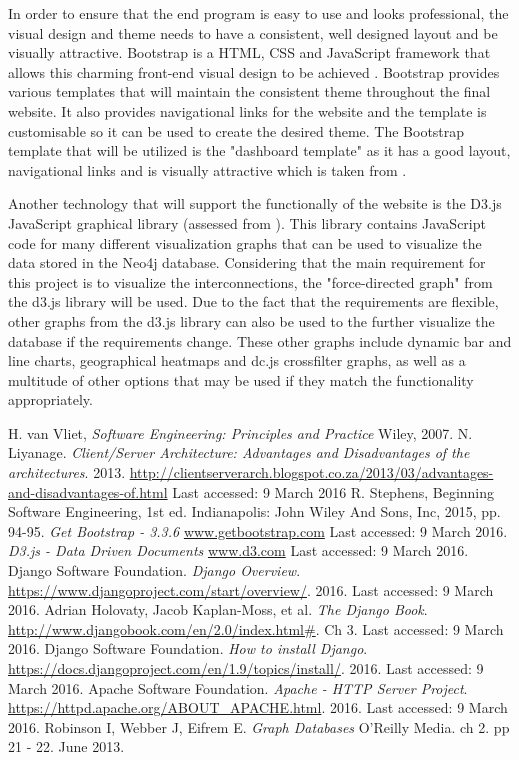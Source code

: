 \documentclass[10pt,onecolumn]{article}
\begin{document}
In order to ensure that the end program is easy to use and looks professional, the visual design and theme needs to have a consistent, well designed layout and be visually attractive. Bootstrap is a HTML, CSS and JavaScript framework that allows this charming front-end visual design to be achieved \cite{Bootstrap}. Bootstrap provides various templates that will maintain the consistent theme throughout the final website. It also provides navigational links for the website and the template is customisable so it can be used to create the desired theme. The Bootstrap template that will be utilized is the "dashboard template" as it has a good layout, navigational links and is visually attractive which is taken from \cite{Bootstrap}.

Another technology that will support the functionally of the website is the D3.js JavaScript graphical library (assessed from \cite{D3}). This library contains JavaScript code for many different visualization graphs that can be used to visualize the data stored in the Neo4j database. Considering that the main requirement for this project is to visualize the interconnections, the "force-directed graph" from the d3.js library will be used. Due to the fact that the requirements are flexible, other graphs from the d3.js library can also be used to the further visualize the database if the requirements change. These other graphs include dynamic bar and line charts, geographical heatmaps and dc.js crossfilter graphs, as well as a multitude of other options that may be used if they match the functionality appropriately.

\begin{thebibliography}{1}
 H. van Vliet, \emph{Software Engineering: Principles and Practice} Wiley, 2007.
 N. Liyanage. \emph{Client/Server Architecture: Advantages and Disadvantages of the architectures}. 2013. \url{http://clientserverarch.blogspot.co.za/2013/03/advantages-and-disadvantages-of.html} Last accessed: 9 March 2016
 R. Stephens, Beginning Software Engineering, 1st ed. Indianapolis: John Wiley And Sons, Inc, 2015, pp. 94-95.
  \emph{Get Bootstrap - 3.3.6} \url{www.getbootstrap.com} Last accessed: 9 March 2016.
  \emph{D3.js - Data Driven Documents} \url{www.d3.com} Last accessed: 9 March 2016.
 Django Software Foundation. \emph{Django Overview}. \url{https://www.djangoproject.com/start/overview/}. 2016. Last accessed: 9 March 2016. 
 Adrian Holovaty, Jacob Kaplan-Moss, et al. \emph{The Django Book}. \url{http://www.djangobook.com/en/2.0/index.html#}. Ch 3. Last accessed: 9 March 2016.
 Django Software Foundation. \emph{How to install Django}. \url{https://docs.djangoproject.com/en/1.9/topics/install/}. 2016. Last accessed: 9 March 2016.	
 Apache Software Foundation. \emph{Apache - HTTP Server Project}. \url{https://httpd.apache.org/ABOUT_APACHE.html}. 2016. Last accessed: 9 March 2016.	
 Robinson I, Webber J, Eifrem E. \emph{Graph Databases} O'Reilly Media. ch 2. pp 21 - 22. June 2013.


\end{thebibliography}

\clearpage
\end{document}
